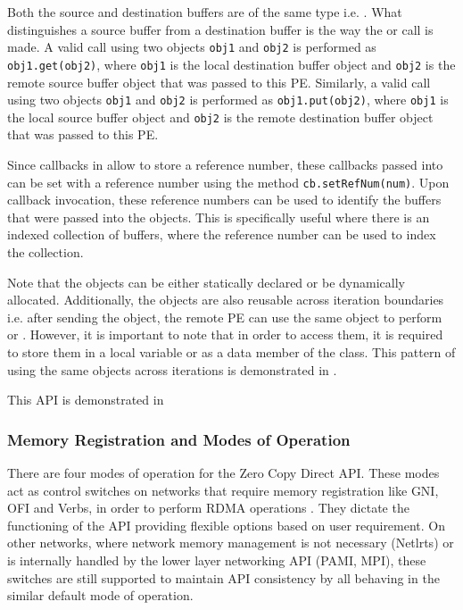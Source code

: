 Both the source and destination buffers are of the same type i.e. .
What distinguishes a source buffer from a destination buffer is the way the  or
 call is made. A valid  call using two  objects \texttt{obj1} and
\texttt{obj2} is performed as \texttt{obj1.get(obj2)}, where \texttt{obj1} is the local destination
buffer object and \texttt{obj2} is the remote source buffer object that was passed to this PE.
Similarly, a valid  call using two  objects \texttt{obj1} and
\texttt{obj2} is performed as \texttt{obj1.put(obj2)}, where \texttt{obj1} is the local source buffer
object and \texttt{obj2} is the remote destination buffer object that was passed to this PE.

Since callbacks in \charmpp{} allow to store a reference number, these
callbacks passed into  can be set with a
reference number using the method \texttt{cb.setRefNum(num)}. Upon callback
invocation, these reference numbers can be used to identify the buffers that
were passed into the  objects. This is
specifically useful where there is an indexed collection of buffers, where the
reference number can be used to index the collection.

Note that the  objects can be
either statically declared or be dynamically allocated.
Additionally, the objects are also reusable across iteration boundaries i.e.
after sending the  object, the remote PE can use
the same object to perform  or . However, it is
important to note that in order to access them, it is required
to store them in a local variable or as a data member of the class. This pattern
of using the same objects across iterations is demonstrated in
.

This API is demonstrated in 

\subsubsection{Memory Registration and Modes of Operation}

There are four modes of operation for the Zero Copy Direct API. These modes
act as control switches on networks that require memory registration like GNI,
OFI and Verbs, in order to perform RDMA operations . They dictate the functioning of the API
providing flexible options based on user requirement. On other networks, where
network memory management is not necessary (Netlrts) or is internally handled by the lower
layer networking API (PAMI, MPI), these switches are still supported to maintain API
consistency by all behaving in the similar default mode of operation.

